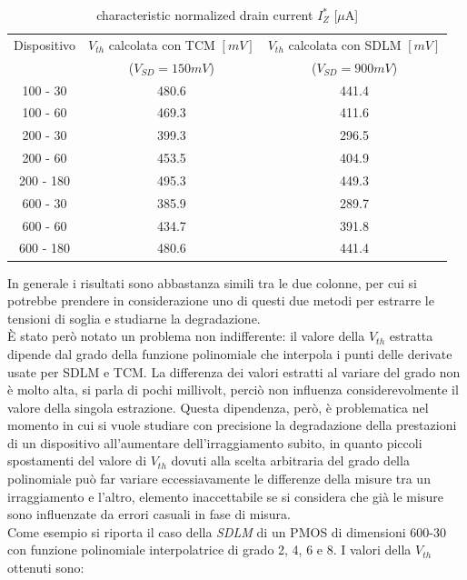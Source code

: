\documentclass[12pt, letterpaper]{book}
\begin{document}
\begin{table}[h!] 
\renewcommand{\arraystretch}{1.3}
\caption{characteristic normalized drain current $I^{*}_{Z}$ [$\mu$A]}
\label{tab:Iz*} 
\begin{center}
\begin{tabular}{ c  c  c }
\hline
Dispositivo &  $V_{th}$  calcolata con TCM $[mV]$  & $V_{th}$  calcolata con SDLM $[mV]$ \\
 & ($V_{SD} = 150 mV$) & ($V_{SD} = 900 mV$) \\
\hline
100 - 30  & 480.6 & 441.4 \\
\hline
100 - 60  & 469.3 & 411.6 \\
\hline
200 - 30  & 399.3 & 296.5 \\
\hline
200 - 60  & 453.5 & 404.9 \\
\hline
200 - 180 & 495.3 & 449.3 \\
\hline
600 - 30 & 385.9 & 289.7 \\
\hline
600 - 60 & 434.7 & 391.8 \\
\hline
600 - 180 & 480.6 & 441.4 \\
\hline

\end{tabular}
\end{center}
\end{table} 

In generale i risultati sono abbastanza simili tra le due colonne, per cui si potrebbe prendere in considerazione uno di questi due metodi  per estrarre le tensioni di soglia e studiarne la degradazione.\\
È stato però notato un problema non indifferente: il valore della $V_{th}$ estratta dipende dal grado della funzione polinomiale che interpola i punti delle derivate usate per SDLM e TCM. La differenza dei valori estratti al variare del grado non è molto alta, si parla di pochi millivolt, perciò non influenza considerevolmente il valore della singola estrazione. Questa dipendenza, però, è problematica nel momento in cui si vuole studiare con precisione la degradazione della prestazioni di un dispositivo all'aumentare dell'irraggiamento subito, in quanto piccoli spostamenti del valore di $V_{th}$ dovuti alla scelta arbitraria del grado della polinomiale può far variare eccessiavamente le differenze della misure tra un irraggiamento e l'altro, elemento inaccettabile se si considera che già le misure sono influenzate da errori casuali in fase di misura.\\
Come esempio si riporta il caso della \emph{SDLM} di un PMOS di dimensioni 600-30 con funzione polinomiale interpolatrice di grado 2, 4, 6 e 8. I valori della $V_{th}$ ottenuti sono: 
\end{document}

